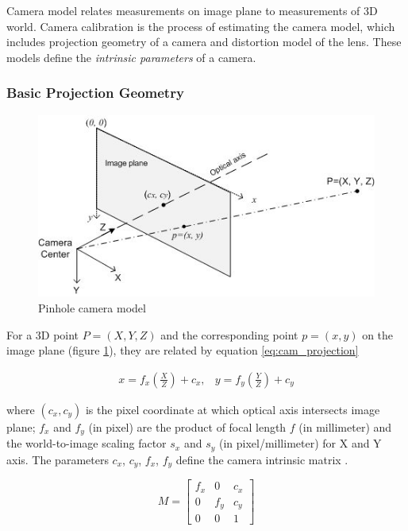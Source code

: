 Camera model relates measurements on image plane to measurements of
3D world. Camera calibration is the process of estimating the camera
model, which includes projection geometry of a camera and distortion
model of the lens. These models define the \textit{intrinsic
  parameters} of a camera.

\subsubsection{Basic Projection Geometry}
\begin{figure}[h]
\centering
\includegraphics[width=12cm, keepaspectratio=true]{./Figures/camera_model.jpg}
\caption{Pinhole camera model}
\label{figch2:cammodel}
\end{figure}

For a 3D point $P=(X, Y, Z)$ and the corresponding point
$p=(x, y)$ on the image plane (figure
\ref{figch2:cammodel}), they are related by equation \ref{eq:cam_projection}
\cite{bradski_learning_2008}

\begin{equation}
\label{eq:cam_projection}
\begin{matrix}
x = f_x\left(\frac{X}{Z}\right)+c_x, &
y=f_y\left(\frac{Y}{Z}\right)+c_y
\end{matrix}
\end{equation}

\noindent where $(c_x, c_y)$ is the pixel coordinate at which optical
axis intersects image plane; $f_x$ and $f_y$ (in pixel) are the product
of focal length $f$ (in millimeter) and the world-to-image scaling
factor $s_x$ and $s_y$ (in pixel/millimeter) for X and Y axis. The
parameters $c_x$, $c_y$, $f_x$, $f_y$ define the camera intrinsic
matrix \cite{bradski_learning_2008} \cite{heikkila_four-step_1997}.

\begin{equation}
M = \begin{bmatrix}
f_x & 0 & c_x \\
0& f_y & c_y \\
0 & 0 & 1 \end{bmatrix}
\end{equation}

